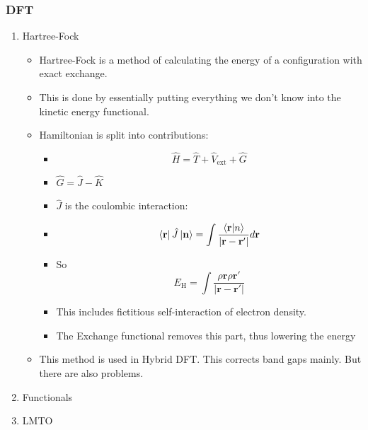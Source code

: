 \documentclass[11pt]{article}
\begin{document}
\subsubsection{DFT}
\label{sec:orgb192204}
\begin{enumerate}
\item Hartree-Fock
\label{sec:orgcd10164}
\begin{itemize}
\item Hartree-Fock is a method of calculating the energy of a configuration
with exact exchange.
\item This is done by essentially putting everything we don't know into the
kinetic energy functional.
\item Hamiltonian is split into contributions:
\begin{itemize}
\item \[\hat{H} = \hat{T} + \hat{V}_{ \text{ext} } + \hat{G}\]
\item \(\hat{G} = \hat{J} - \hat{K}\)
\item \(\hat{J}\) is the coulombic interaction:
\item \[ \bra{ \mathbf{r} } \hat{J} \ket{ \mathbf{n} } = \int \frac{ \bra{\mathbf{r}}\ket{n} }{|\mathbf{r} - \mathbf{r'}  |}d\mathbf{r} \]
\item So \[ E_{\text{H}} = \int \frac{\rho{\mathbf{r}\rho{\mathbf{r}'}}}{|\mathbf{r} - \mathbf{r'}|}\]
\item This includes fictitious self-interaction of electron density.
\item The Exchange functional removes this part, thus lowering the energy
\end{itemize}

\item This method is used in Hybrid DFT. This corrects band gaps mainly. But
there are also problems.
\end{itemize}

\item Functionals
\label{sec:orgb5f9884}
\item LMTO
\label{sec:org101e91c}
\end{enumerate}
\end{document}
